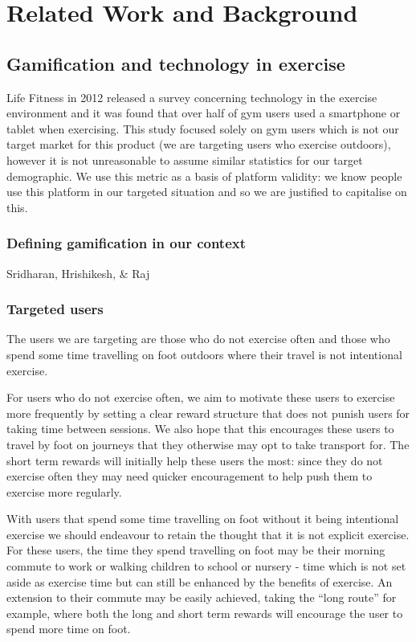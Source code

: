 \chapter{Related Work and Background}\label{ch_background}

\section{Gamification and technology in exercise}

Life Fitness in 2012 released a survey concerning technology in the
exercise environment\cite{lifefitness} and it was found that over half of
gym users used a smartphone or tablet when exercising. This study
focused solely on gym users which is not our target market for this
product (we are targeting users who exercise outdoors), however it is
not unreasonable to assume similar statistics for our target
demographic. We use this metric as a basis of platform validity: we
know people use this platform in our targeted situation and so we are
justified to capitalise on this.

\subsection{Defining gamification in our context}
Sridharan, Hrishikesh, \& Raj\cite{academic_gamification}



\subsection{Targeted users}
The users we are targeting are those who do not exercise often and
those who spend some time travelling on foot outdoors where their
travel is not intentional exercise. 

For users who do not exercise often, we aim to motivate these users to
exercise more frequently by setting a clear reward structure that does
not punish users for taking time between sessions. We also hope that
this encourages these users to travel by foot on journeys that they
otherwise may opt to take transport for. The short term rewards will
initially help these users the most: since they do not exercise
often they may need quicker encouragement to help push them to
exercise more regularly.

With users that spend some time travelling on foot without it being
intentional exercise we should endeavour to retain the thought that it
is not explicit exercise. For these users, the time they spend
travelling on foot may be their morning commute to work or walking
children to school or nursery - time which is not set aside as
exercise time but can still be enhanced by the benefits of
exercise. An extension to their commute may be easily achieved, taking
the ``long route'' for example, where both the long and short term
rewards will encourage the user to spend more time on foot. 

